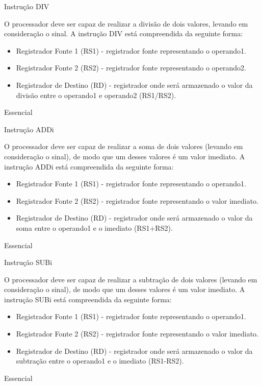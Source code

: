 \documentclass{article}
\begin{document}
\begin{functional}
       \requirement
      {Instrução DIV}
      {O processador deve ser capaz de realizar a divisão de dois valores, levando em consideração o sinal.
      A instrução DIV está compreendida da seguinte forma:\\
       \begin{itemize}
        \item Registrador Fonte 1 (RS1) - registrador fonte representando o operando1.
        \item Registrador Fonte 2 (RS2) - registrador fonte representando o operando2.
        \item Registrador de Destino (RD) - registrador onde será armazenado o valor da divisão entre o operando1 e operando2 (RS1/RS2).
       \end{itemize}
       }
      {Essencial}
      
      \requirement
      {Instrução ADDi}
      {O processador deve ser capaz de realizar a soma de dois valores (levando em consideração o sinal), de modo que um desses valores é um valor imediato. A instrução ADDi está compreendida da seguinte forma:\\
       \begin{itemize}
        \item Registrador Fonte 1 (RS1) - registrador fonte representando o operando1.
        \item Registrador Fonte 2 (RS2) - registrador fonte representando o valor imediato.
        \item Registrador de Destino (RD) - registrador onde será armazenado o valor da soma entre o operando1 e o imediato (RS1+RS2).
       \end{itemize}
       }
      {Essencial}
      
      \requirement
      {Instrução SUBi}
      {O processador deve ser capaz de realizar a subtração de dois valores (levando em consideração o sinal), de modo que um desses valores é um valor imediato. A instrução SUBi está compreendida da seguinte forma:\\
       \begin{itemize}
        \item Registrador Fonte 1 (RS1) - registrador fonte representando o operando1.
        \item Registrador Fonte 2 (RS2) - registrador fonte representando o valor imediato.
        \item Registrador de Destino (RD) - registrador onde será armazenado o valor da subtração entre o operando1 e o imediato (RS1-RS2).
       \end{itemize}
       }
      {Essencial}


\end{functional}
\end{document}
